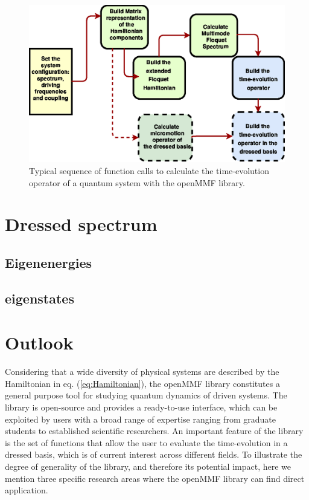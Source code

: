 \documentclass[pra,twocolumn,showkeys,preprintnumbers, amsmath,amssymb, aps,A4paper]{revtex4-1}
\begin{document}
\begin{figure}[!htb]
\centering
\includegraphics[width=0.8\linewidth]{MultimodeFloquetFigure1.ps}
\caption{\label{fig:FlowChart} Typical sequence of function calls to calculate the time-evolution operator of a quantum system with the openMMF library.}
\end{figure}

\section{Dressed spectrum}
\subsection{Eigenenergies}
\subsection{eigenstates}

\section{\label{sec:sequence} Outlook}
Considering that a wide diversity of physical systems are described by the Hamiltonian in eq. (\ref{eq:Hamiltonian}), the openMMF library constitutes a general purpose tool for studying quantum dynamics of driven systems. The library is open-source and provides a ready-to-use interface, which can be exploited by users with a broad range of expertise ranging from graduate students to established scientific researchers. An important feature of the library is the set of functions that allow the user to evaluate the time-evolution in a dressed basis, which is of current interest across different fields. To illustrate the degree of generality of the library, and therefore its potential impact, here we mention three specific research areas where the openMMF library can find direct application.
\end{document}
